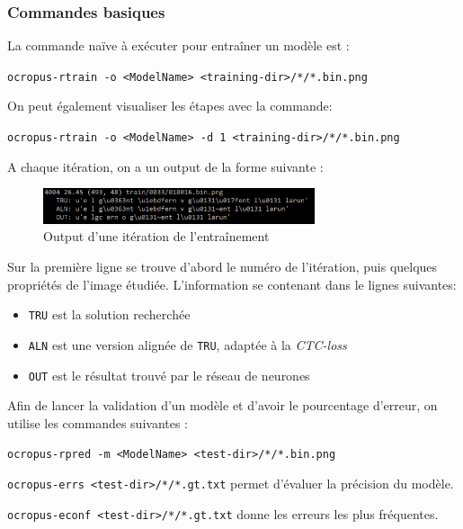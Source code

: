 \documentclass{report}
\begin{document}
\subsubsection{Commandes basiques}

La commande naïve à exécuter pour entraîner un modèle est :

\begin{center}
    \texttt{ocropus-rtrain -o <ModelName> <training-dir>/*/*.bin.png}
\end{center}

On peut également visualiser les étapes avec la commande:

\begin{center}
    \texttt{ocropus-rtrain -o <ModelName> -d 1 <training-dir>/*/*.bin.png}
\end{center}

\noindent A chaque itération, on a un output de la forme suivante : 

\begin{figure}[!h] 
    \center
    \includegraphics[width=8cm]{img/screen_output.png}
    \caption{Output d'une itération de l'entraînement}
    \label{API}
\end{figure}

Sur la première ligne se trouve d'abord le numéro de l'itération, puis quelques propriétés de l'image étudiée. L'information se contenant dans le lignes suivantes:
\begin{itemize}
    \item \texttt{TRU} est la solution recherchée
    \item \texttt{ALN} est une version alignée de \texttt{TRU}, adaptée à la \textit{CTC-loss}
    \item \texttt{OUT} est le résultat trouvé par le réseau de neurones
\end{itemize}

Afin de lancer la validation d'un modèle et d'avoir le pourcentage d'erreur, on utilise les commandes suivantes :

\begin{center}
    \texttt{ocropus-rpred -m <ModelName> <test-dir>/*/*.bin.png}

    \texttt{ocropus-errs <test-dir>/*/*.gt.txt} permet d'évaluer la précision du modèle.

    \texttt{ocropus-econf <test-dir>/*/*.gt.txt} donne les erreurs les plus fréquentes.
\end{center}
\end{document}

